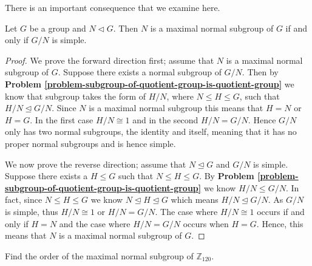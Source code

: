 There is an important consequence that we examine here.
\begin{theorem}\label{thrm-maximal-normal-subgroup-iff-quotient-is-simple}
    Let $G$ be a group and $N \lhd G$. Then $N$ is a maximal normal subgroup of $G$ if and only if $G/N$ is simple.
\end{theorem}

\begin{proof}
    We prove the forward direction first; assume that $N$ is a maximal normal subgroup of $G$. Suppose there exists a normal subgroup of $G/N$. Then by \textbf{Problem \ref{problem-subgroup-of-quotient-group-is-quotient-group}} we know that subgroup takes the form of $H/N$, where $N \leq H \leq G$, such that $H/N \unlhd G/N$. Since $N$ is a maximal normal subgroup this means that $H = N$ or $H = G$. In the first case $H/N \cong 1$ and in the second $H / N = G/N$. Hence $G/N$ only has two normal subgroups, the identity and itself, meaning that it has no proper normal subgroups and is hence simple.
    
    We now prove the reverse direction; assume that $N \unlhd G$ and $G/N$ is simple. Suppose there exists a $H \leq G$ such that $N \leq H \leq G$. By \textbf{Problem \ref{problem-subgroup-of-quotient-group-is-quotient-group}} we know $H/N \leq G/N$. In fact, since $N \leq H \leq G$ we know $N \unlhd H \unlhd G$ which means $H/N \unlhd G/N$. As $G/N$ is simple, thus $H/N \cong 1$ or $H/N = G/N$. The case where $H/N \cong 1$ occurs if and only if $H = N$ and the case where $H/N = G/N$ occurs when $H = G$. Hence, this means that $N$ is a maximal normal subgroup of $G$.
\end{proof}

\begin{exercise}
    Find the order of the maximal normal subgroup of $\mathbb{Z}_{120}$.
\end{exercise}

